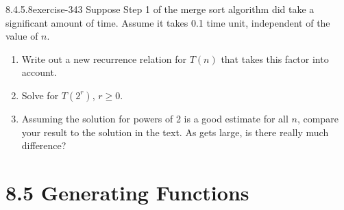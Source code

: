 \documentclass[twoside,10pt,]{book}
\numberwithin{equation}{section}
\begin{document}
\begin{divisionsolution}{8.4.5.8}{}{exercise-343}%
\hypertarget{p-2831}{}%
Suppose Step 1 of the merge sort algorithm did take a significant amount of time. Assume it takes 0.1 time unit, independent of the value of \(n\).%
\par
\hypertarget{p-2832}{}%
\leavevmode%
\begin{enumerate}[label=(\alph*)]
\item\hypertarget{li-1384}{}\hypertarget{p-2833}{}%
Write out a new recurrence relation for \(T(n)\) that takes this factor into account.%
\item\hypertarget{li-1385}{}\hypertarget{p-2834}{}%
Solve for \(T\left(2^r\right)\), \(r \geq  0\).%
\item\hypertarget{li-1386}{}\hypertarget{p-2835}{}%
Assuming the solution for powers of 2 is a good estimate for all \(n\), compare your result to the solution in the text. As gets large, is there really much difference?%
\end{enumerate}
%
\end{divisionsolution}%
\section*{8.5 Generating Functions}
\end{document}
